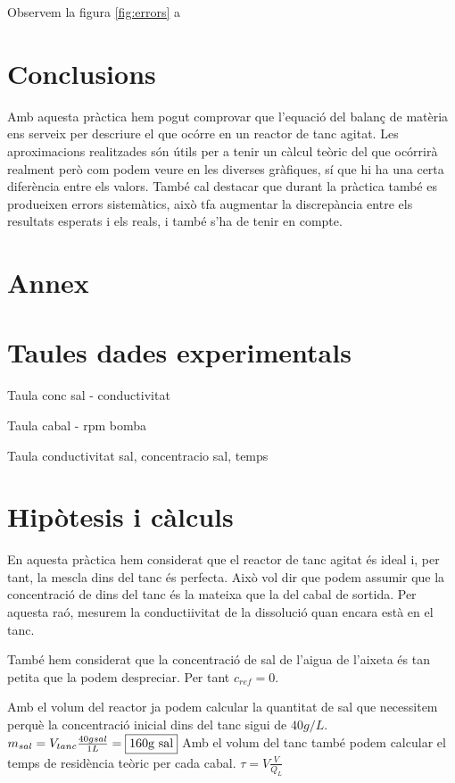 \documentclass[10pt, twoside]{article}
\begin{document}
Observem la figura \ref{fig:errors} a

\section{Conclusions}
Amb aquesta pràctica hem pogut comprovar que l'equació del balanç de matèria ens serveix per descriure el que ocórre en un reactor de tanc agitat. Les aproximacions realitzades són útils per a tenir un càlcul teòric del que ocórrirà realment però com podem veure en les diverses gràfiques, sí que hi ha una certa diferència entre els valors. També cal destacar que durant la pràctica també es produeixen errors sistemàtics, això tfa augmentar la discrepància entre els resultats esperats i els reals, i també s'ha de tenir en compte.

\section*{Annex}

\appendix

\section{Taules dades experimentals}

Taula conc sal - conductivitat

Taula cabal - rpm bomba

Taula conductivitat sal, concentracio sal, temps

\section{Hipòtesis i càlculs}

En aquesta pràctica hem considerat que el reactor de tanc agitat és ideal i, per tant, la mescla dins del tanc és perfecta. Això vol dir que podem assumir que la concentració de dins del tanc és la mateixa que la del cabal de sortida. Per aquesta raó, mesurem la conductiivitat de la dissolució quan encara està en el tanc.

També hem considerat que la concentració de sal de l'aigua de l'aixeta és tan petita que la podem despreciar. Per tant $c_{ref} = 0$.

Amb el volum del reactor ja podem calcular la quantitat de sal que necessitem perquè la concentració inicial dins del tanc sigui de $40g/L$. 
    $m_{sal} = V_{tanc}\frac{40g sal}{1L} = \fbox{160g sal}$
Amb el volum del tanc també podem calcular el temps de residència teòric per cada cabal.
    $\tau = V\frac{V}{Q_L}$
\end{document}
